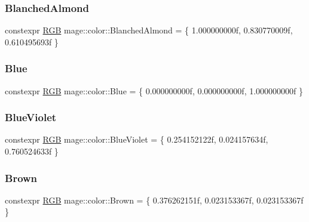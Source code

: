 \subsubsection{\texorpdfstring{Blanched\+Almond}{BlanchedAlmond}}
{\footnotesize\ttfamily constexpr \mbox{\hyperlink{structmage_1_1_r_g_b}{R\+GB}} mage\+::color\+::\+Blanched\+Almond = \{ 1.\+000000000f, 0.\+830770009f, 0.\+610495693f \}}

\mbox{\label{namespacemage_1_1color_af2a2acff5b9725eb57bef7dc4822892b}} 
\subsubsection{\texorpdfstring{Blue}{Blue}}
{\footnotesize\ttfamily constexpr \mbox{\hyperlink{structmage_1_1_r_g_b}{R\+GB}} mage\+::color\+::\+Blue = \{ 0.\+000000000f, 0.\+000000000f, 1.\+000000000f \}}

\mbox{\label{namespacemage_1_1color_a456981fe1885b8347622a2b63fc27fe0}} 
\subsubsection{\texorpdfstring{Blue\+Violet}{BlueViolet}}
{\footnotesize\ttfamily constexpr \mbox{\hyperlink{structmage_1_1_r_g_b}{R\+GB}} mage\+::color\+::\+Blue\+Violet = \{ 0.\+254152122f, 0.\+024157634f, 0.\+760524633f \}}

\mbox{\label{namespacemage_1_1color_ae17f4f7f2abb3b569dcda75a56a6e0fc}} 
\subsubsection{\texorpdfstring{Brown}{Brown}}
{\footnotesize\ttfamily constexpr \mbox{\hyperlink{structmage_1_1_r_g_b}{R\+GB}} mage\+::color\+::\+Brown = \{ 0.\+376262151f, 0.\+023153367f, 0.\+023153367f \}}

\mbox{\label{namespacemage_1_1color_ad61a0cb85a0718f107d24a9ccb14f7a9}} 
